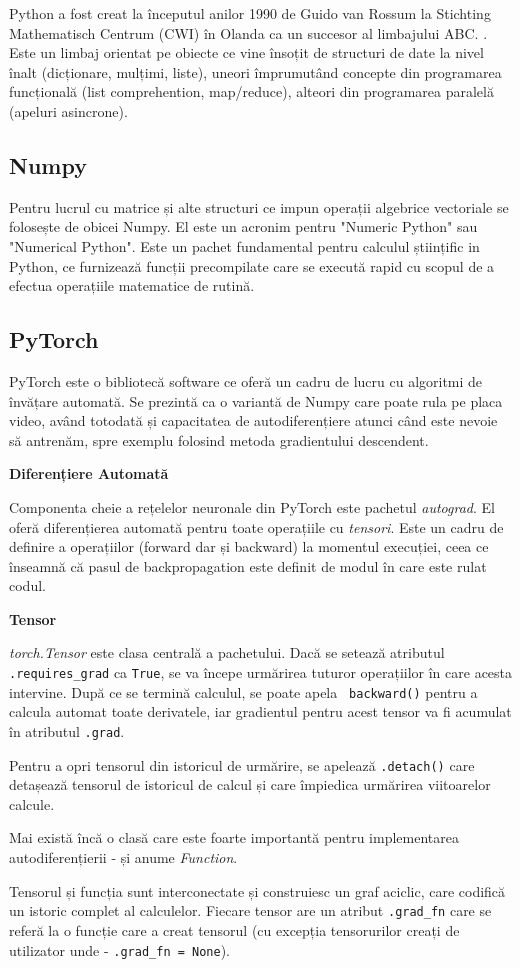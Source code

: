 Python a fost creat la începutul anilor 1990 de Guido van Rossum la Stichting Mathematisch Centrum (CWI) în Olanda ca un succesor al limbajului ABC. \cite{pythonhistory}. Este un limbaj orientat pe obiecte ce vine însoțit de structuri de date la nivel înalt (dicționare, mulțimi, liste), uneori împrumutând concepte din programarea funcțională (list comprehention, map/reduce), alteori din programarea paralelă (apeluri asincrone).

\subsection{Numpy}

Pentru lucrul cu matrice și alte structuri ce impun operații algebrice vectoriale se folosește de obicei Numpy. El este un acronim pentru "Numeric Python" sau "Numerical Python". Este un pachet fundamental pentru calculul științific in Python, ce furnizează funcții precompilate care se execută rapid cu scopul de a efectua operațiile matematice de rutină.

\subsection{PyTorch}

PyTorch \cite{pytorch} este o bibliotecă software ce oferă un cadru de lucru cu algoritmi de învățare automată. Se prezintă ca o variantă de Numpy care poate rula pe placa video, având totodată și capacitatea de autodiferențiere atunci când este nevoie să antrenăm, spre exemplu folosind metoda gradientului descendent.

\textbf{Diferențiere Automată}

Componenta cheie a rețelelor neuronale din PyTorch este pachetul \textit{autograd}. El oferă diferențierea automată pentru toate operațiile cu \textit{tensori}. Este un cadru de definire a operațiilor (forward dar și backward) la momentul execuției, ceea ce înseamnă că pasul de backpropagation este definit de modul în care este rulat codul.

\textbf{Tensor}

\textit{torch.Tensor} este clasa centrală a pachetului. Dacă se setează atributul \texttt{.requires\_grad} ca  \texttt{True}, se va începe urmărirea tuturor operațiilor în care acesta intervine. După ce se termină calculul, se poate apela \texttt{ backward()} pentru a calcula automat toate derivatele, iar gradientul pentru acest tensor va fi acumulat în atributul \texttt{.grad}.

Pentru a opri tensorul din istoricul de urmărire, se apelează \texttt{.detach()} care detașează tensorul de istoricul de calcul și care împiedica urmărirea viitoarelor calcule.

Mai există încă o clasă care este foarte importantă pentru implementarea autodiferențierii - și anume \textit{Function}.

Tensorul și funcția sunt interconectate și construiesc un graf aciclic, care codifică un istoric complet al calculelor. Fiecare tensor are un atribut  \texttt{.grad\_fn} care se referă la o funcție care a creat tensorul (cu excepția tensorurilor creați de utilizator unde - \texttt{.grad\_fn = None}).